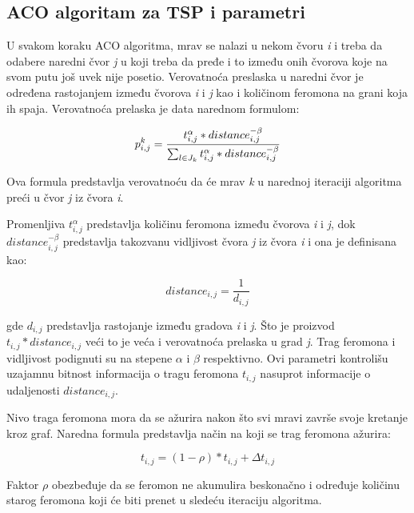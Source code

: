 \documentclass[a4paper]{article}
\begin{document}
{\subsection{ACO algoritam za TSP i parametri}
\label{subsec:podnaslov1}

U svakom koraku ACO algoritma, mrav se nalazi u nekom čvoru \textit{i} i treba da odabere naredni čvor \textit{j} u koji treba da pređe i to između onih čvorova koje na svom putu još uvek nije posetio. Verovatnoća preslaska u naredni čvor je određena rastojanjem između čvorova \textit{i} i \textit{j} kao i količinom feromona na grani koja ih spaja. Verovatnoća prelaska je data narednom formulom:

\begin{equation}\label{1}
p_{i,j}^k = {t_{i,j}^\alpha * distance_{i,j}^{-\beta} \over \sum_{l \in J_k}^{} t_{i,j}^\alpha * distance_{i,j}^{-\beta}}
\end{equation}

Ova formula predstavlja verovatnoću da će mrav \textit{k} u narednoj iteraciji algoritma preći u čvor \textit{j} iz čvora \textit{i}.


Promenljiva $t_{i,j}^\alpha$ predstavlja količinu feromona između čvorova \textit{i} i \textit{j}, dok $distance_{i,j}^{-\beta}$ predstavlja takozvanu vidljivost čvora \textit{j}  iz čvora \textit{i} i ona je definisana kao:

\begin{equation}\label{2}
distance_{i,j} = \frac{1}{d_{i,j}}
\end{equation}

gde $d_{i,j}$ predstavlja rastojanje između gradova \textit{i} i \textit{j}. Što je proizvod $t_{i,j} * distance_{i,j}$ veći to je veća i verovatnoća prelaska u grad \textit{j}. Trag feromona i vidljivost podignuti su na stepene $\alpha$ i $\beta$ respektivno. Ovi parametri kontrolišu uzajamnu bitnost informacija o tragu feromona $t_{i,j}$ nasuprot informacije o udaljenosti $distance_{i,j}$.

Nivo traga feromona mora da se ažurira nakon što svi mravi završe svoje kretanje kroz graf. Naredna formula predstavlja način na koji se trag feromona ažurira:

\begin{equation}\label{3}
t_{i,j} = (1-\rho) * t_{i,j} + \Delta t_{i,j}
\end{equation}

Faktor $\rho$ obezbeđuje da se feromon ne akumulira beskonačno i određuje količinu starog feromona koji će biti prenet u sledeću iteraciju algoritma.

}
\end{document}
